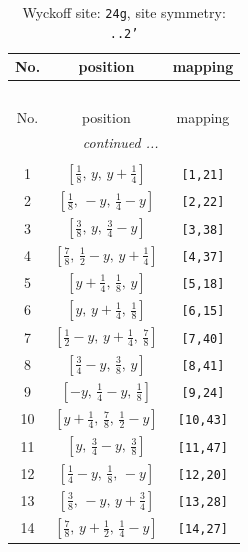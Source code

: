 \documentclass[fleqn,8pt]{jsarticle}
\begin{document}
\begin{longtable}{ccc}
\caption{Wyckoff site: {\tt 24g}, site symmetry: {\tt ..2'}}
 \\
 \hline \hline
No. & position & mapping \\ \hline \endfirsthead

\multicolumn{2}{l}{\tablename\ \thetable{}} \\
 \hline \hline
No. & position & mapping \\ \hline \endhead

 \hline \hline
\multicolumn{2}{r}{\footnotesize\it continued ...} \\ \endfoot

 \hline \hline
\multicolumn{2}{r}{} \\ \endlastfoot

1 & $\left[ \frac{1}{8},\, y,\, y + \frac{1}{4} \right]$ & {\tt [1,21]} \\ \hline
2 & $\left[ \frac{1}{8},\, - y,\, \frac{1}{4} - y \right]$ & {\tt [2,22]} \\ \hline
3 & $\left[ \frac{3}{8},\, y,\, \frac{3}{4} - y \right]$ & {\tt [3,38]} \\ \hline
4 & $\left[ \frac{7}{8},\, \frac{1}{2} - y,\, y + \frac{1}{4} \right]$ & {\tt [4,37]} \\ \hline
5 & $\left[ y + \frac{1}{4},\, \frac{1}{8},\, y \right]$ & {\tt [5,18]} \\ \hline
6 & $\left[ y,\, y + \frac{1}{4},\, \frac{1}{8} \right]$ & {\tt [6,15]} \\ \hline
7 & $\left[ \frac{1}{2} - y,\, y + \frac{1}{4},\, \frac{7}{8} \right]$ & {\tt [7,40]} \\ \hline
8 & $\left[ \frac{3}{4} - y,\, \frac{3}{8},\, y \right]$ & {\tt [8,41]} \\ \hline
9 & $\left[ - y,\, \frac{1}{4} - y,\, \frac{1}{8} \right]$ & {\tt [9,24]} \\ \hline
10 & $\left[ y + \frac{1}{4},\, \frac{7}{8},\, \frac{1}{2} - y \right]$ & {\tt [10,43]} \\ \hline
11 & $\left[ y,\, \frac{3}{4} - y,\, \frac{3}{8} \right]$ & {\tt [11,47]} \\ \hline
12 & $\left[ \frac{1}{4} - y,\, \frac{1}{8},\, - y \right]$ & {\tt [12,20]} \\ \hline
13 & $\left[ \frac{3}{8},\, - y,\, y + \frac{3}{4} \right]$ & {\tt [13,28]} \\ \hline
14 & $\left[ \frac{7}{8},\, y + \frac{1}{2},\, \frac{1}{4} - y \right]$ & {\tt [14,27]} \\ \hline

\end{longtable}
\end{document}
